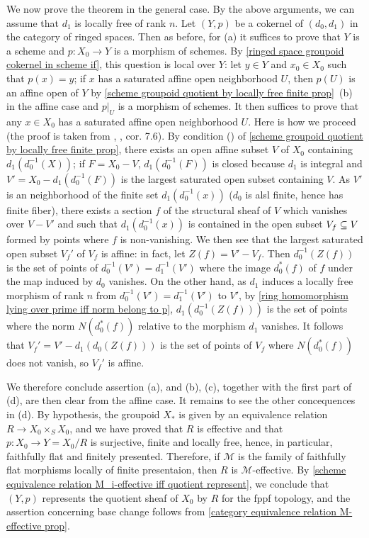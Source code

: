 We now prove the theorem in the general case. By the above arguments, we can assume that $d_1$ is locally free of rank $n$. Let $(Y,p)$ be a cokernel of $(d_0,d_1)$ in the category of ringed spaces. Then as before, for (a) it suffices to prove that $Y$ is a scheme and $p:X_0\to Y$ is a morphism of schemes. By \cref{ringed space groupoid cokernel in scheme if}, this question is local over $Y$: let $y\in Y$ and $x_0\in X_0$ such that $p(x)=y$; if $x$ has a saturated affine open neighborhood $U$, then $p(U)$ is an affine open of $Y$ by \cref{scheme groupoid quotient by locally free finite prop}~(b) in the affine case and $p|_U$ is a morphism of schemes. It then suffices to prove that any $x\in X_0$ has a saturated affine open neighborhood $U$. Here is how we proceed (the proof is taken from \cite{SGA1}, , cor. 7.6). By condition () of \cref{scheme groupoid quotient by locally free finite prop}, there exists an open affine subset $V$ of $X_0$ containing $d_1(d_0^{-1}(X))$; if $F=X_0-V$, $d_1(d_0^{-1}(F))$ is closed because $d_1$ is integral and $V'=X_0-d_1(d_0^{-1}(F))$ is the largest saturated open subset containing $V$. As $V'$ is an neighborhood of the finite set $d_1(d_0^{-1}(x))$ ($d_0$ is alsl finite, hence has finite fiber), there exists a section $f$ of the structural sheaf of $V$ which vanishes over $V-V'$ and such that $d_1(d_0^{-1}(x))$ is contained in the open subset $V_f\subseteq V$ formed by points where $f$ is non-vanishing. We then see that the largest saturated open subset $V_f'$ of $V_f$ is affine: in fact, let $Z(f)=V'-V_f$. Then $d_0^{-1}(Z(f))$ is the set of points of $d_0^{-1}(V')=d_1^{-1}(V')$ where the image $d_0^*(f)$ of $f$ under the map induced by $d_0$ vanishes. On the other hand, as $d_1$ induces a locally free morphism of rank $n$ from $d_0^{-1}(V')=d_1^{-1}(V')$ to $V'$, by \cref{ring homomorphism lying over prime iff norm belong to p}, $d_1(d_0^{-1}(Z(f)))$ is the set of points where the norm $N(d_0^*(f))$ relative to the morphism $d_1$ vanishes. It follows that $V_f'=V'-d_1(d_0(Z(f)))$ is the set of points of $V_f$ where $N(d_0^*(f))$ does not vanish, so $V_f'$ is affine.\par
We therefore conclude assertion (a), and (b), (c), together with the first part of (d), are then clear from the affine case. It remains to see the other concequences in (d). By hypothesis, the groupoid $X_*$ is given by an equivalence relation $R\to X_0\times_SX_0$, and we have proved that $R$ is effective and that $p:X_0\to Y=X_0/R$ is surjective, finite and locally free, hence, in particular, faithfully flat and finitely presented. Therefore, if $\mathcal{M}$ is the family of faithfully flat morphisms locally of finite presentaion, then $R$ is $\mathcal{M}$-effective. By \cref{scheme equivalence relation M_i-effective iff quotient represent}, we conclude that $(Y,p)$ represents the quotient sheaf of $X_0$ by $R$ for the fppf topology, and the assertion concerning base change follows from \cref{category equivalence relation M-effective prop}.

